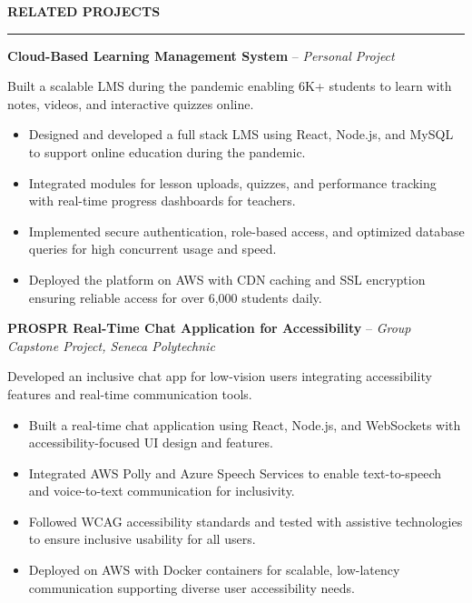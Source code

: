 \documentclass[10pt,letterpaper]{article}
\begin{document}
\vspace{6pt}

\textbf{RELATED PROJECTS}\\[-8pt]
\noindent\rule{\textwidth}{1pt}

\vspace{-2pt}

\textbf{Cloud-Based Learning Management System} -- \emph{Personal Project}

\vspace{-1pt}

Built a scalable LMS during the pandemic enabling 6K+ students to learn with notes, videos, and interactive quizzes online.
\vspace{-1pt}
\begin{itemize}
\item Designed and developed a full stack LMS using React, Node.js, and MySQL to support online education during the pandemic.
\item Integrated modules for lesson uploads, quizzes, and performance tracking with real-time progress dashboards for teachers.
\item Implemented secure authentication, role-based access, and optimized database queries for high concurrent usage and speed.
\item Deployed the platform on AWS with CDN caching and SSL encryption ensuring reliable access for over 6,000 students daily.
\end{itemize}

\textbf{PROSPR  Real-Time Chat Application for Accessibility} -- \emph{Group Capstone Project, Seneca Polytechnic}

\vspace{-1pt}

Developed an inclusive chat app for low-vision users integrating accessibility features and real-time communication tools.
\vspace{-1pt}
\begin{itemize}
\item Built a real-time chat application using React, Node.js, and WebSockets with accessibility-focused UI design and features.
\item Integrated AWS Polly and Azure Speech Services to enable text-to-speech and voice-to-text communication for inclusivity.
\item Followed WCAG accessibility standards and tested with assistive technologies to ensure inclusive usability for all users.
\item Deployed on AWS with Docker containers for scalable, low-latency communication supporting diverse user accessibility needs.
\end{itemize}
\end{document}
